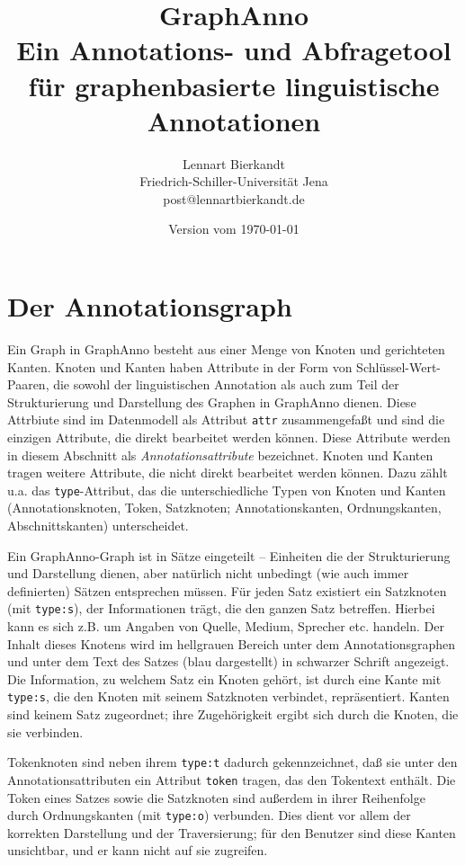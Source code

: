 \documentclass[12pt]{scrartcl}
\title{\LARGE GraphAnno\\ \large Ein Annotations- und Abfragetool\\für graphenbasierte linguistische Annotationen}
\author{Lennart Bierkandt\\\large Friedrich-Schiller-Universität Jena\\[-.2em]\large post@lennartbierkandt.de}
\date{Version vom \today}
\begin{document}
\maketitle

\renewcommand{\baselinestretch}{1.05}\normalsize

\renewcommand{\contentsname}{Inhalt}
\tableofcontents


\section{Der Annotationsgraph}

Ein Graph in GraphAnno besteht aus einer Menge von Knoten und gerichteten Kanten. Knoten und Kanten haben Attribute in der Form von Schlüssel-Wert-Paaren, die sowohl der linguistischen Annotation als auch zum Teil der Strukturierung und Darstellung des Graphen in GraphAnno dienen. Diese Attrbiute sind im Datenmodell als Attribut \texttt{attr} zusammengefaßt und sind die einzigen Attribute, die direkt bearbeitet werden können. Diese Attribute werden in diesem Abschnitt als \textit{Annotationsattribute} bezeichnet. Knoten und Kanten tragen weitere Attribute, die nicht direkt bearbeitet werden können. Dazu zählt u.a. das \texttt{type}-Attribut, das die unterschiedliche Typen von Knoten und Kanten (Annotationsknoten, Token, Satzknoten; Annotationskanten, Ordnungskanten, Abschnittskanten) unterscheidet.

Ein GraphAnno-Graph ist in Sätze eingeteilt – Einheiten die der Strukturierung und Darstellung dienen, aber natürlich nicht unbedingt (wie auch immer definierten) Sätzen entsprechen müssen.
Für jeden Satz existiert ein Satzknoten (mit \texttt{type:s}), der Informationen trägt, die den ganzen Satz betreffen. Hierbei kann es sich z.B. um Angaben von Quelle, Medium, Sprecher etc. handeln. Der Inhalt dieses Knotens wird im hellgrauen Bereich unter dem Annotationsgraphen und unter dem Text des Satzes (blau dargestellt) in schwarzer Schrift angezeigt.
Die Information, zu welchem Satz ein Knoten gehört, ist durch eine Kante mit \texttt{type:s}, die den Knoten mit seinem Satzknoten verbindet, repräsentiert. Kanten sind keinem Satz zugeordnet; ihre Zugehörigkeit ergibt sich durch die Knoten, die sie verbinden.

Tokenknoten sind neben ihrem \texttt{type:t} dadurch gekennzeichnet, daß sie unter den Annotationsattributen ein Attribut \texttt{token} tragen, das den Tokentext enthält. Die Token eines Satzes sowie die Satzknoten sind außerdem in ihrer Reihenfolge durch Ordnungskanten (mit \texttt{type:o}) verbunden. Dies dient vor allem der korrekten Darstellung und der Traversierung; für den Benutzer sind diese Kanten unsichtbar, und er kann nicht auf sie zugreifen.
\end{document}
